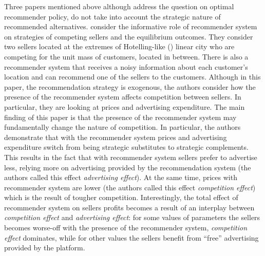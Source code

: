 \documentclass[a4paper]{article}
\begin{document}
	Three papers mentioned above although address the question on optimal recommender policy, do not take into account the strategic nature of recommended alternatives.
	\cite{chen2016advertising} consider the informative role of recommender system on strategies of competing sellers and the equilibrium outcomes. They consider two sellers located at the extremes of Hotelling-like (\cite{harold1929stability}) linear city who are competing for the unit mass of customers, located in between. There is also a recommender system that receives a noisy information about each customer's location and can recommend one of the sellers to the customers. Although in this paper, the recommendation strategy is exogenous, the authors consider how the presence of the recommender system affects competition between sellers. In particular, they are looking at prices and advertising expenditure. The main finding of this paper is that the presence of the recommender system may fundamentally change the nature of competition. In particular, the authors demonstrate that with the recommender system prices and advertising expenditure switch from being strategic substitutes to strategic complements. This results in the fact that with recommender system sellers prefer to advertise less, relying more on advertising provided by the recommendation system (the authors called this effect \textit{advertising effect}). At the same time, prices with recommender system are lower (the authors called this effect \textit{competition effect}) which is the result of tougher competition. Interestingly, the total effect of recommender system on sellers profits becomes a result of an interplay between \textit{competition effect} and \textit{advertising effect}: for some values of parameters the sellers becomes worse-off with the presence of the recommender system, \textit{competition effect} dominates, while for other values the sellers benefit from ``free'' advertising provided by the platform.
	
\end{document}
